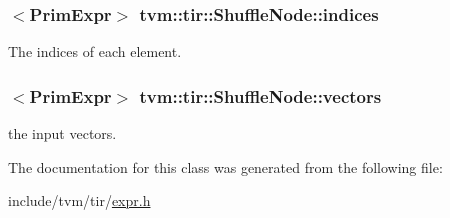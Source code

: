 \subsubsection[{\texorpdfstring{indices}{indices}}]{$<${\bf Prim\+Expr}$>$ tvm\+::tir\+::\+Shuffle\+Node\+::indices}\hypertarget{classtvm_1_1tir_1_1ShuffleNode_a3e4a328452a531b67642117f023e8a0e}{}\label{classtvm_1_1tir_1_1ShuffleNode_a3e4a328452a531b67642117f023e8a0e}


The indices of each element. 

\subsubsection[{\texorpdfstring{vectors}{vectors}}]{$<${\bf Prim\+Expr}$>$ tvm\+::tir\+::\+Shuffle\+Node\+::vectors}\hypertarget{classtvm_1_1tir_1_1ShuffleNode_aa444b61cf671ef31060535c61746ab6c}{}\label{classtvm_1_1tir_1_1ShuffleNode_aa444b61cf671ef31060535c61746ab6c}


the input vectors. 



The documentation for this class was generated from the following file\+:\begin{DoxyCompactItemize}
\item 
include/tvm/tir/\hyperlink{tir_2expr_8h}{expr.\+h}\end{DoxyCompactItemize}
